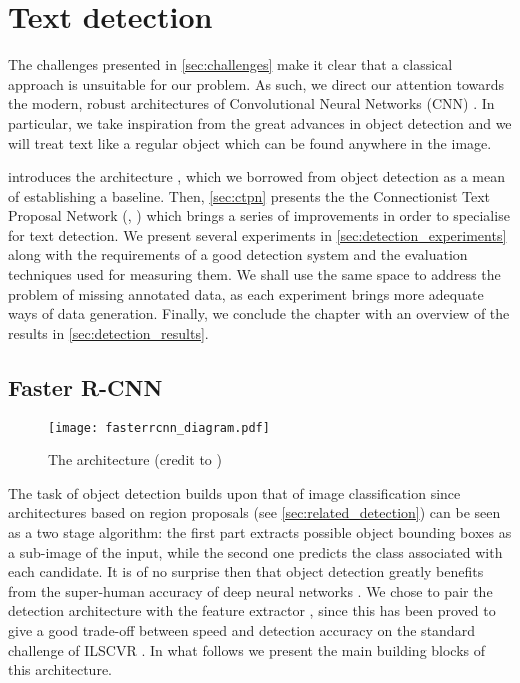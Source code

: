 
\chapter{Text detection}
\label{ch:detection}

The challenges presented in \autoref{sec:challenges} make it clear that a classical approach is unsuitable for our problem. As such, we direct our attention towards the modern, robust architectures of Convolutional Neural Networks (CNN) \citep{leCun_CNN}. In particular, we take inspiration from the great advances in object detection and we will treat text like a regular object which can be found anywhere in the image.

 introduces the \FRCNN{} architecture \citep{faster_rcnn}, which we borrowed from object detection as a mean of establishing a baseline. Then, \autoref{sec:ctpn} presents the the Connectionist Text Proposal Network (\CTPN{}, \citet{ctpn}) which brings a series of improvements in order to specialise for text detection. We present several experiments in \autoref{sec:detection_experiments} along with the requirements of a good detection system and the evaluation techniques used for measuring them. We shall use the same space to address the problem of missing annotated data, as each experiment brings more adequate ways of data generation. Finally, we conclude the chapter with an overview of the results in \autoref{sec:detection_results}.


\section{Faster R-CNN}\label{sec:faster_rcnn}

	\begin{figure}
		\texttt{[image: fasterrcnn\_diagram.pdf]}
		\caption[The \FRCNN{} architecture]{The \FRCNN{} architecture (credit to \cite{detection_benchmark}) \label{fig:faster_rcnn}}
	\end{figure}

	The task of object detection builds upon that of image classification since architectures based on region proposals (see \autoref{sec:related_detection}) can be seen as a two stage algorithm: the first part extracts possible object bounding boxes as a sub-image of the input, while the second one predicts the class associated with each candidate. It is of no surprise then that object detection greatly benefits from the super-human accuracy of deep neural networks \citep{superhuman_classif}. We chose to pair the \FRCNN{} detection architecture with the \RESNET{} feature extractor \citep{resnet}, since this has been proved to give a good trade-off between speed and detection accuracy on the standard challenge of ILSCVR \citep{detection_benchmark}. In what follows we present the main building blocks of this architecture.

